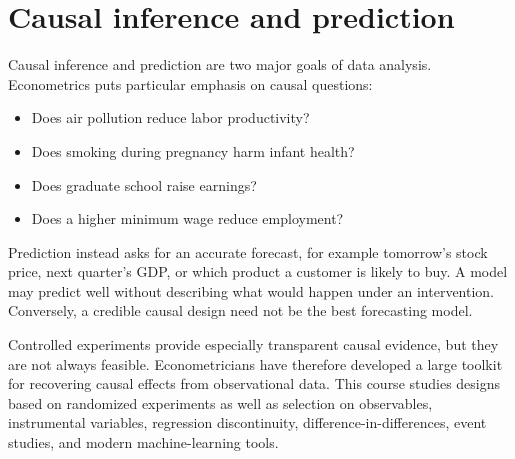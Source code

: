 \section{Causal inference and prediction}

Causal inference and prediction are two major goals of data analysis.
Econometrics puts particular emphasis on causal questions:
\begin{itemize}
  \item Does air pollution reduce labor productivity?
  \item Does smoking during pregnancy harm infant health?
  \item Does graduate school raise earnings?
  \item Does a higher minimum wage reduce employment?
\end{itemize}
Prediction instead asks for an accurate forecast, for example tomorrow's
stock price, next quarter's GDP, or which product a customer is likely to
buy.  A model may predict well without describing what would happen under an
intervention.  Conversely, a credible causal design need not be the best
forecasting model.

Controlled experiments provide especially transparent causal evidence, but
they are not always feasible.  Econometricians have therefore developed a
large toolkit for recovering causal effects from observational data.  This
course studies designs based on randomized experiments as well as selection
on observables, instrumental variables, regression discontinuity,
difference-in-differences, event studies, and modern machine-learning tools.
